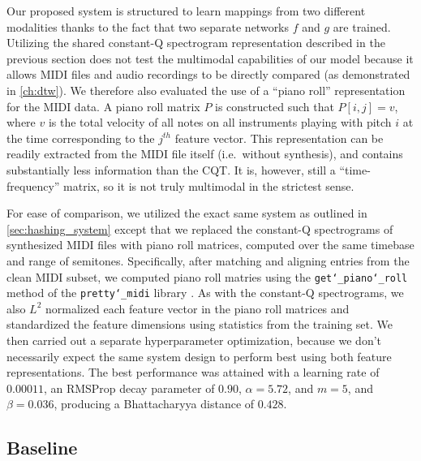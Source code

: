 Our proposed system is structured to learn mappings from two different modalities thanks to the fact that two separate networks $f$ and $g$ are trained.
Utilizing the shared constant-Q spectrogram representation described in the previous section does not test the multimodal capabilities of our model because it allows MIDI files and audio recordings to be directly compared (as demonstrated in \cref{ch:dtw}).
We therefore also evaluated the use of a ``piano roll'' representation for the MIDI data.
A piano roll matrix $P$ is constructed such that $P[i, j] = v$, where $v$ is the total velocity of all notes on all instruments playing with pitch $i$ at the time corresponding to the $j^{th}$ feature vector.
This representation can be readily extracted from the MIDI file itself (i.e.\ without synthesis), and contains substantially less information than the CQT.
It is, however, still a ``time-frequency'' matrix, so it is not truly multimodal in the strictest sense.

For ease of comparison, we utilized the exact same system as outlined in \cref{sec:hashing_system} except that we replaced the constant-Q spectrograms of synthesized MIDI files with piano roll matrices, computed over the same timebase and range of semitones.
Specifically, after matching and aligning entries from the clean MIDI subset, we computed piano roll matries using the \texttt{get\char`_piano\char`_roll} method of the \texttt{pretty\char`_midi} library \cite{raffel2014pretty_midi}.
As with the constant-Q spectrograms, we also $L^2$ normalized each feature vector in the piano roll matrices and standardized the feature dimensions using statistics from the training set.
We then carried out a separate hyperparameter optimization, because we don't necessarily expect the same system design to perform best using both feature representations.
The best performance was attained with a learning rate of $0.00011$, an RMSProp decay parameter of $0.90$, $\alpha = 5.72$, and $m = 5$, and $\beta = 0.036$, producing a Bhattacharyya distance of $0.428$.

\subsection{Baseline}
\label{sec:baseline}

